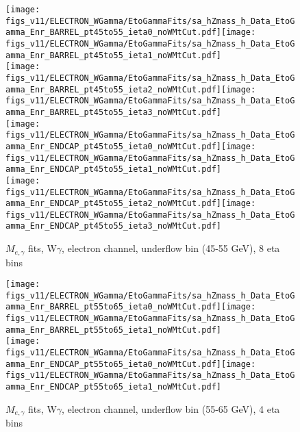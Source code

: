 \begin{figure}[htb]
  \begin{center}
   \texttt{[image: figs\_v11/ELECTRON\_WGamma/EtoGammaFits/sa\_hZmass\_h\_Data\_EtoGamma\_Enr\_BARREL\_pt45to55\_ieta0\_noWMtCut.pdf]}\texttt{[image: figs\_v11/ELECTRON\_WGamma/EtoGammaFits/sa\_hZmass\_h\_Data\_EtoGamma\_Enr\_BARREL\_pt45to55\_ieta1\_noWMtCut.pdf]}\\
   \texttt{[image: figs\_v11/ELECTRON\_WGamma/EtoGammaFits/sa\_hZmass\_h\_Data\_EtoGamma\_Enr\_BARREL\_pt45to55\_ieta2\_noWMtCut.pdf]}\texttt{[image: figs\_v11/ELECTRON\_WGamma/EtoGammaFits/sa\_hZmass\_h\_Data\_EtoGamma\_Enr\_BARREL\_pt45to55\_ieta3\_noWMtCut.pdf]}\\
   \texttt{[image: figs\_v11/ELECTRON\_WGamma/EtoGammaFits/sa\_hZmass\_h\_Data\_EtoGamma\_Enr\_ENDCAP\_pt45to55\_ieta0\_noWMtCut.pdf]}\texttt{[image: figs\_v11/ELECTRON\_WGamma/EtoGammaFits/sa\_hZmass\_h\_Data\_EtoGamma\_Enr\_ENDCAP\_pt45to55\_ieta1\_noWMtCut.pdf]}\\
   \texttt{[image: figs\_v11/ELECTRON\_WGamma/EtoGammaFits/sa\_hZmass\_h\_Data\_EtoGamma\_Enr\_ENDCAP\_pt45to55\_ieta2\_noWMtCut.pdf]}\texttt{[image: figs\_v11/ELECTRON\_WGamma/EtoGammaFits/sa\_hZmass\_h\_Data\_EtoGamma\_Enr\_ENDCAP\_pt45to55\_ieta3\_noWMtCut.pdf]}\\
  \label{fig:etogFits_45to55}
  \caption{$M_{e,\gamma}$ fits, W$\gamma$, electron channel, underflow bin (45-55 GeV), 8 eta bins}
  \end{center}
\end{figure}

\begin{figure}[htb]
  \begin{center}
   \texttt{[image: figs\_v11/ELECTRON\_WGamma/EtoGammaFits/sa\_hZmass\_h\_Data\_EtoGamma\_Enr\_BARREL\_pt55to65\_ieta0\_noWMtCut.pdf]}\texttt{[image: figs\_v11/ELECTRON\_WGamma/EtoGammaFits/sa\_hZmass\_h\_Data\_EtoGamma\_Enr\_BARREL\_pt55to65\_ieta1\_noWMtCut.pdf]}\\
   \texttt{[image: figs\_v11/ELECTRON\_WGamma/EtoGammaFits/sa\_hZmass\_h\_Data\_EtoGamma\_Enr\_ENDCAP\_pt55to65\_ieta0\_noWMtCut.pdf]}\texttt{[image: figs\_v11/ELECTRON\_WGamma/EtoGammaFits/sa\_hZmass\_h\_Data\_EtoGamma\_Enr\_ENDCAP\_pt55to65\_ieta1\_noWMtCut.pdf]}\\
  \label{fig:etogFits_55to65}
  \caption{$M_{e,\gamma}$ fits, W$\gamma$, electron channel, underflow bin (55-65 GeV), 4 eta bins}
  \end{center}
\end{figure}

